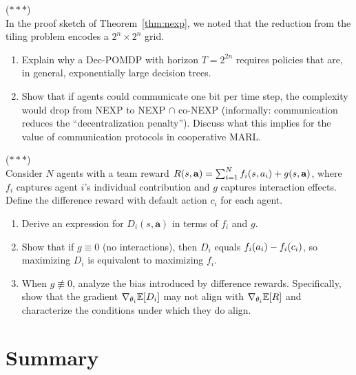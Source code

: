 \documentclass[11pt,a4paper]{article}
\begin{document}
\begin{exercise}
\textnormal{(\(***\))} \\
In the proof sketch of Theorem~\ref{thm:nexp}, we noted that the
reduction from the tiling problem encodes a $2^n \times 2^n$ grid.
\begin{enumerate}[label=(\alph*)]
  \item Explain why a Dec-POMDP with horizon $T = 2^{2n}$ requires
    policies that are, in general, exponentially large decision
    trees.
  \item Show that if agents could communicate one bit per time step,
    the complexity would drop from NEXP to NEXP $\cap$ co-NEXP
    (informally: communication reduces the ``decentralization
    penalty'').  Discuss what this implies for the value of
    communication protocols in cooperative MARL.
\end{enumerate}
\end{exercise}

\begin{exercise}
\textnormal{(\(***\))} \\
Consider $N$ agents with a team reward $R(s, \mathbf{a}) =
\sum_{i=1}^N f_i(s, a_i) + g(s, \mathbf{a})$, where $f_i$
captures agent $i$'s individual contribution and $g$ captures
interaction effects.  Define the difference reward with default
action $c_i$ for each agent.
\begin{enumerate}[label=(\alph*)]
  \item Derive an expression for $D_i(s, \mathbf{a})$ in terms
    of $f_i$ and $g$.
  \item Show that if $g \equiv 0$ (no interactions), then $D_i$
    equals $f_i(a_i) - f_i(c_i)$, so maximizing $D_i$ is
    equivalent to maximizing $f_i$.
  \item When $g \not\equiv 0$, analyze the bias introduced by
    difference rewards.  Specifically, show that the gradient
    $\nabla_{\theta_i} \mathbb{E}[D_i]$ may not align with
    $\nabla_{\theta_i} \mathbb{E}[R]$ and characterize the conditions
    under which they do align.
\end{enumerate}
\end{exercise}

\section{Summary}
\label{sec:summary}
\end{document}
